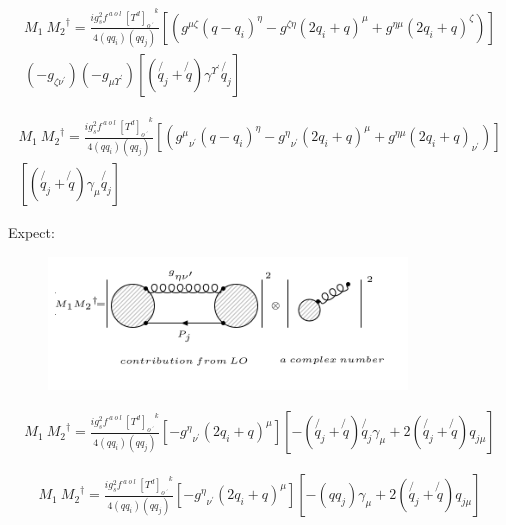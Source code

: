 \begin{equation}
\begin{split}
M_1\:{M_2}^{\dagger}=\frac{ig_s ^2 f^{\:a\:o\:l}\: {[T^d]_{o\:^{\prime}}}^k}{4(qq_i)(qq_j)}
[(g^{{\mu}{\zeta}}(q-q_i)^{\eta}-g^{{\zeta}{\eta}}(2q_i +q)^{\mu}+g^{{\eta}{\mu}}(2q_i +q)^{\zeta})]\\
(-g_{{{\zeta}}{{\nu}^{\prime}}})(-g_{{\mu}{{\Upsilon}^{\prime}}})[(\not{q_j} + \not{q})\gamma^{{\Upsilon}^{\prime}}\not{q_j}]
\end{split}
\end{equation}

\begin{equation}
\begin{split}
M_1\:{M_2}^{\dagger}=\frac{ig_s ^2 f^{\:a\:o\:l}\: {[T^d]_{o\:^{\prime}}}^k}{4(qq_i)(qq_j)}
[({g^{{\mu}}}_{{\nu}^{\prime}}(q-q_i)^{\eta}-{g^{{\eta}}}_{{\nu}^{\prime}}(2q_i +q)^{\mu}+g^{{\eta}{\mu}}(2q_i +q)_{{\nu}^{\prime}})]\\
[(\not{q_j} + \not{q})\gamma_{{\mu}}\not{q_j}]
\end{split}
\end{equation}

Expect:
\begin{figure}[h!]
\centering
\includegraphics[width=0.85\textwidth]{images/expectationM1M2daggerggq.png}
\end{figure}
\pagebreak
\begin{equation}
\begin{split}
M_1\:{M_2}^{\dagger}=\frac{ig_s ^2 f^{\:a\:o\:l}\: {[T^d]_{o\:^{\prime}}}^k}{4(qq_i)(qq_j)}
[-{g^{{\eta}}}_{{\nu}^{\prime}}(2q_i +q)^{\mu}]
[-(\not{q_j} + \not{q})\not{q_j}\gamma_{{\mu}} +2(\not{q_j} + \not{q}){q}_{j\mu}]
\end{split}
\end{equation}

\begin{equation}
\begin{split}
M_1\:{M_2}^{\dagger}=\frac{ig_s ^2 f^{\:a\:o\:l}\: {[T^d]_{o\:^{\prime}}}^k}{4(qq_i)(qq_j)}
[-{g^{{\eta}}}_{{\nu}^{\prime}}(2q_i +q)^{\mu}]
[-(qq_j)\gamma_{{\mu}} +2(\not{q_j} + \not{q}){q}_{j\mu}]
\end{split}
\end{equation}


